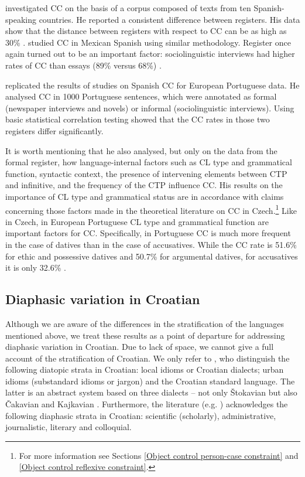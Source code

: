 \citet{Davies95} investigated CC on the basis of a corpus composed of texts from ten Spanish-speaking countries. He reported a consistent difference between registers. His data show that the distance between registers with respect to CC can be as high as 30\% \citep[cf.][373f]{Davies95}. \citet{Cacoullos99} studied CC in Mexican Spanish using similar methodology. Register once again turned out to be an important factor: sociolinguistic interviews had higher rates of CC than essays (89\% versus 68\%) \citep[cf.][]{Cacoullos99}.

\citet{Andrade10} replicated the results of studies on Spanish CC for European Portuguese data. He analysed CC in 1000 Portuguese sentences, which were annotated as formal (newspaper interviews and novels) or informal (sociolinguistic interviews). Using basic statistical correlation testing \citet[99]{Andrade10} showed that the CC rates in those two registers differ significantly. 

It is worth mentioning that he also analysed, but only on the data from the formal register, how language-internal factors such as CL type and grammatical function, syntactic context, the presence of intervening elements between CTP and infinitive, and the frequency of the CTP influence CC. His results on the importance of CL type and grammatical status are in accordance with claims concerning those factors made in the theoretical literature on CC in Czech.\footnote{For more information see Sections \ref{Object control person-case constraint} and \ref{Object control reflexive constraint}.} Like in Czech, in European Portuguese CL type and grammatical function are important factors for CC. Specifically, in Portuguese CC is much more frequent in the case of datives than in the case of accusatives. While the CC rate is 51.6\% for ethic and possessive datives and 50.7\% for argumental datives, for accusatives it is only 32.6\% \citep[cf.][101]{Andrade10}. 

\subsection{Diaphasic variation in Croatian}

Although we are aware of the differences in the stratification of the languages mentioned above, we treat these results as a point of departure for addressing diaphasic variation in Croatian. Due to lack of space, we cannot give a full account of the stratification of Croatian. We only refer to \citet[10--17]{FHM06}, who distinguish the following diatopic strata in Croatian: local idioms or Croatian dialects; urban idioms (substandard idioms or jargon) and the Croatian standard language. The latter is an abstract system based on three dialects – not only Štokavian but also Čakavian and Kajkavian \citep[cf.][22f]{FHM06}. Furthermore, the literature (e.g. \citealt[230]{FHM06}) acknowledges the following diaphasic strata in Croatian: scientific (scholarly), administrative, journalistic, literary and colloquial.

